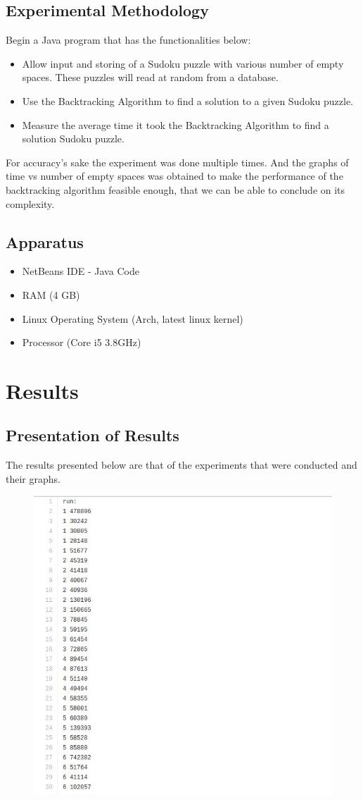 \documentclass[12pt]{article}
\begin{document}
\subsection{Experimental Methodology}
Begin a Java program that has the functionalities below:\\
\begin{itemize}
	\item Allow input and storing of a Sudoku puzzle with various number of empty spaces. These puzzles will read at random from a database.
	\item Use the Backtracking Algorithm to find a solution to a given Sudoku puzzle.
	\item Measure the average time it took the Backtracking Algorithm to find a solution Sudoku puzzle. 
\end{itemize}
For accuracy's sake the experiment was done multiple times. And the graphs of time vs number of empty spaces was obtained to make the performance of the backtracking algorithm feasible enough, that we can be able to conclude on its complexity.
\subsection{Apparatus}
\begin{itemize}
	\item NetBeans IDE - Java Code
	\item RAM (4 GB)
	\item Linux Operating System (Arch, latest linux kernel) 
	\item Processor (Core i5 3.8GHz) 
\end{itemize}

\section{Results}	

\subsection{Presentation of Results}
The results presented below are that of the experiments that were conducted and their graphs.

\begin{figure}[H]
\centering
\includegraphics[width=0.7\linewidth]{1-30.jpg}
\label{fig:1-30}
\end{figure}
\end{document}
